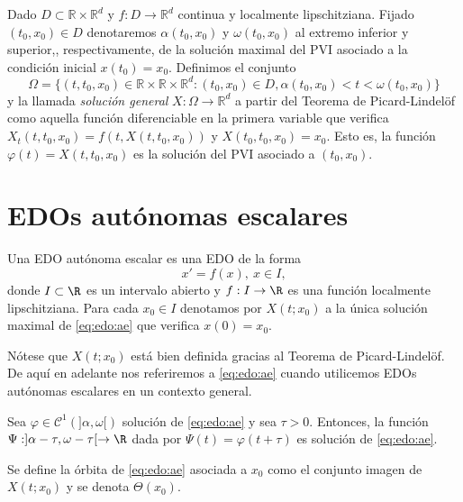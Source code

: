 \documentclass{article}
\begin{document}
Dado $D \subset \mathbb{R} \times \mathbb{R}^d$ y $f : D \to \mathbb{R}^d$ continua y localmente lipschitziana. Fijado $(t_0, x_0) \in D$ denotaremos $\alpha(t_0, x_0)$ y $\omega(t_0, x_0)$ al extremo inferior y superior,, respectivamente, de la solución maximal del PVI asociado a la condición inicial $x(t_0) = x_0$. Definimos el conjunto
\[\Omega = \{(t, t_0, x_0) \in \mathbb{R}\times\mathbb{R}\times\mathbb{R}^d : (t_0, x_0) \in D, \alpha(t_0, x_0) < t < \omega(t_0, x_0)\}\]
y la llamada \emph{solución general} $X: \Omega \to \mathbb{R}^d$ a partir del Teorema de Picard-Lindelöf como aquella función diferenciable en la primera variable que verifica $X_t(t, t_0, x_0) = f(t, X(t, t_0, x_0))$ y $X(t_0, t_0, x_0) = x_0$. Esto es, la función $\varphi(t) = X(t, t_0, x_0)$ es la solución del PVI asociado a $(t_0, x_0)$.

\section{EDOs autónomas escalares}

\begin{definition}
  Una EDO autónoma escalar es una EDO de la forma
  \begin{equation}
    \label{eq:edo:ae}
    x' = f(x), \ x \in I,
    \tag{AE}
  \end{equation}
  donde $I \subset \R$ es un intervalo abierto y $f : I \to \R$ es una función localmente
  lipschitziana. Para cada $x_0 \in I$ denotamos por $X(t; x_0)$ a la única solución maximal de
  \eqref{eq:edo:ae} que verifica $x(0) = x_0$.
\end{definition}

Nótese que $X(t; x_0)$ está bien definida gracias al Teorema de Picard-Lindelöf. De aquí en adelante
nos referiremos a \eqref{eq:edo:ae} cuando utilicemos EDOs autónomas escalares en un contexto
general.

\begin{lemma} \label{lem:ae:trans}
  Sea $\varphi \in \mathcal{C}^1(]\alpha, \omega[)$ solución de \eqref{eq:edo:ae} y sea $\tau >
  0$. Entonces, la función $\Psi: ]\alpha-\tau, \omega-\tau[ \to \R$ dada por
  $\Psi(t) = \varphi(t+\tau)$ es solución de \eqref{eq:edo:ae}.
\end{lemma}

\begin{definition}
  Se define la órbita de \eqref{eq:edo:ae} asociada a $x_0$ como el conjunto imagen de $X(t; x_0)$ y
  se denota $\Theta(x_0)$.
\end{definition}
\end{document}
